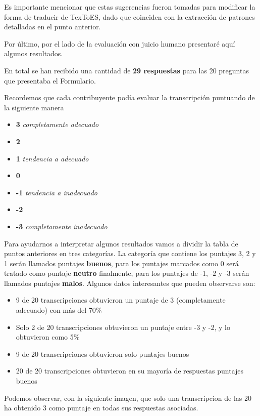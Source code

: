 Es importante mencionar que estas sugerencias fueron tomadas para modificar la forma de traducir de TexToES, dado que coinciden con la extracción de patrones detalladas en el punto anterior.

Por último, por el lado de la evaluación con juicio humano presentaré aquí algunos resultados.

En total se han recibido una cantidad de \textbf{29 respuestas} para las 20 preguntas que presentaba el Formulario.

Recordemos que cada contribuyente podía evaluar la transcripción puntuando de la siguiente manera

\begin{itemize}
    \item \textbf{3} \textit{completamente adecuado}
    \item \textbf{2}
    \item \textbf{1} \textit{tendencia a adecuado}
    \item \textbf{0}
    \item \textbf{-1} \textit{tendencia a inadecuado}
    \item \textbf{-2}
    \item \textbf{-3} \textit{completamente inadecuado}
\end{itemize}

Para ayudarnos a interpretar algunos resultados vamos a dividir la tabla de puntos anteriores en tres categorías. La categoría que contiene los puntajes 3, 2 y 1 serán llamados puntajes \textbf{buenos}, para los puntajes marcados como 0 será tratado como puntaje \textbf{neutro} finalmente, para los puntajes de -1, -2 y -3 serán llamados puntajes \textbf{malos}.
Algunos datos interesantes que pueden observarse son:

\begin{itemize}
    \item 9 de 20 transcripciones obtuvieron un puntaje de 3 (completamente adecuado) con más del 70\%
    \item Solo 2 de 20 transcripciones obtuvieron un puntaje entre -3 y -2, y lo obtuvieron como 5\%
    \item 9 de 20 transcripciones obtuvieron solo puntajes buenos
    \item 20 de 20 transcripciones obtuvieron en su mayoría de respuestas puntajes buenos
\end{itemize}

Podemos observar, con la siguiente imagen, que solo una transcripcion de las 20 ha obtenido 3 como puntaje en todas sus respuestas asociadas.

